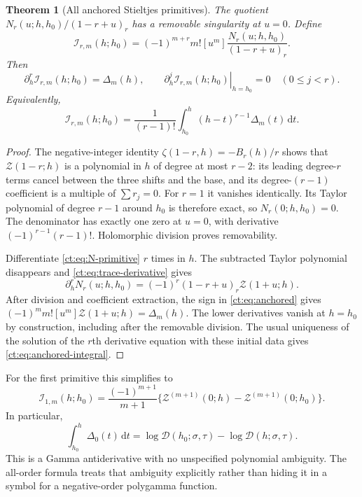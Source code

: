 \documentclass[11pt]{article}
\numberwithin{equation}{section}
\newtheorem{theorem}{Theorem}[section]
\theoremstyle{definition}\newtheorem{definition}[theorem]{Definition}
\theoremstyle{remark}\newtheorem{remark}[theorem]{Remark}
\newcommand{\dd}{\,\mathrm d}
\newcommand{\Ztr}{\mathcal Z}
\newcommand{\Dtr}{\mathcal D}
\begin{document}
\begin{theorem}[All anchored Stieltjes primitives]\label{ct:thm:anchored}
The quotient $N_r(u;h,h_0)/(1-r+u)_r$ has a removable singularity at $u=0$.
Define
\begin{equation}\label{ct:eq:anchored}
 \mathcal I_{r,m}(h;h_0)=(-1)^{m+r}m![u^m]
                \frac{N_r(u;h,h_0)}{(1-r+u)_r}.
\end{equation}
Then
\begin{equation}\label{ct:eq:anchored-properties}
 \partial_h^r\mathcal I_{r,m}(h;h_0)=\Delta_m(h),\qquad
 \left.\partial_h^j\mathcal I_{r,m}(h;h_0)\right|_{h=h_0}=0
       \quad(0\le j<r).
\end{equation}
Equivalently,
\begin{equation}\label{ct:eq:anchored-integral}
 \mathcal I_{r,m}(h;h_0)
   =\frac1{(r-1)!}\int_{h_0}^{h}(h-t)^{r-1}\Delta_m(t)\dd t.
\end{equation}
\end{theorem}
\begin{proof}
The negative-integer identity
$\zeta(1-r,h)=-B_r(h)/r$ shows that $\Ztr(1-r;h)$ is a polynomial in $h$
of degree at most $r-2$: its leading degree-$r$ terms cancel between the
three shifts and the base, and its degree-$(r-1)$ coefficient is a multiple
of $\sum r_j=0$. For $r=1$ it vanishes identically. Its Taylor polynomial
of degree $r-1$ around $h_0$ is therefore exact, so $N_r(0;h,h_0)=0$.
The denominator has exactly one zero at $u=0$, with derivative
$(-1)^{r-1}(r-1)!$. Holomorphic division proves removability.

Differentiate \eqref{ct:eq:N-primitive} $r$ times in $h$. The subtracted
Taylor polynomial disappears and \eqref{ct:eq:trace-derivative} gives
\[
 \partial_h^r N_r(u;h,h_0)
       =(-1)^r(1-r+u)_r\Ztr(1+u;h).
\]
After division and coefficient extraction, the sign in
\eqref{ct:eq:anchored} gives $(-1)^m m![u^m]\Ztr(1+u;h)=\Delta_m(h)$.
The lower derivatives vanish at $h=h_0$ by construction, including after
the removable division. The usual uniqueness of the solution of the
$r$th derivative equation with these initial data gives
\eqref{ct:eq:anchored-integral}.
\end{proof}

For the first primitive this simplifies to
\begin{equation}\label{ct:eq:first-primitive}
 \mathcal I_{1,m}(h;h_0)=\frac{(-1)^{m+1}}{m+1}
       \{\Ztr^{(m+1)}(0;h)-\Ztr^{(m+1)}(0;h_0)\}.
\end{equation}
In particular,
\begin{equation}\label{ct:eq:gamma-primitive}
 \int_{h_0}^{h}\Delta_0(t)\dd t
       =\log\Dtr(h_0;\sigma,\tau)-\log\Dtr(h;\sigma,\tau).
\end{equation}
This is a Gamma antiderivative with no unspecified polynomial ambiguity.
The all-order formula treats that ambiguity explicitly rather than hiding
it in a symbol for a negative-order polygamma function.
\end{document}

